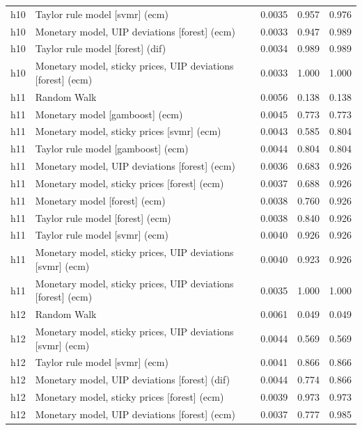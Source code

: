 \begin{ThreePartTable}
\begin{longtable}[t]{cp{5.5cm}ccc}
h10 & \raggedright Taylor rule model [svmr] (ecm) & 0.0035 & 0.957 & 0.976\\
h10 & \raggedright Monetary model, UIP deviations [forest] (ecm) & 0.0033 & 0.947 & 0.989\\
h10 & \raggedright Taylor rule model [forest] (dif) & 0.0034 & 0.989 & 0.989\\
h10 & \raggedright Monetary model, sticky prices, UIP deviations [forest] (ecm) & 0.0033 & 1.000 & 1.000\\
\addlinespace
h11 & \raggedright Random Walk & 0.0056 & 0.138 & 0.138\\
h11 & \raggedright Monetary model [gamboost] (ecm) & 0.0045 & 0.773 & 0.773\\
h11 & \raggedright Monetary model, sticky prices [svmr] (ecm) & 0.0043 & 0.585 & 0.804\\
h11 & \raggedright Taylor rule model [gamboost] (ecm) & 0.0044 & 0.804 & 0.804\\
h11 & \raggedright Monetary model, UIP deviations [forest] (ecm) & 0.0036 & 0.683 & 0.926\\
h11 & \raggedright Monetary model, sticky prices [forest] (ecm) & 0.0037 & 0.688 & 0.926\\
h11 & \raggedright Monetary model [forest] (ecm) & 0.0038 & 0.760 & 0.926\\
h11 & \raggedright Taylor rule model [forest] (ecm) & 0.0038 & 0.840 & 0.926\\
h11 & \raggedright Taylor rule model [svmr] (ecm) & 0.0040 & 0.926 & 0.926\\
h11 & \raggedright Monetary model, sticky prices, UIP deviations [svmr] (ecm) & 0.0040 & 0.923 & 0.926\\
h11 & \raggedright Monetary model, sticky prices, UIP deviations [forest] (ecm) & 0.0035 & 1.000 & 1.000\\
\addlinespace
h12 & \raggedright Random Walk & 0.0061 & 0.049 & 0.049\\
h12 & \raggedright Monetary model, sticky prices, UIP deviations [svmr] (ecm) & 0.0044 & 0.569 & 0.569\\
h12 & \raggedright Taylor rule model [svmr] (ecm) & 0.0041 & 0.866 & 0.866\\
h12 & \raggedright Monetary model, UIP deviations [forest] (dif) & 0.0044 & 0.774 & 0.866\\
h12 & \raggedright Monetary model, sticky prices [forest] (ecm) & 0.0039 & 0.973 & 0.973\\
h12 & \raggedright Monetary model, UIP deviations [forest] (ecm) & 0.0037 & 0.777 & 0.985\\

\end{longtable}
\end{ThreePartTable}
